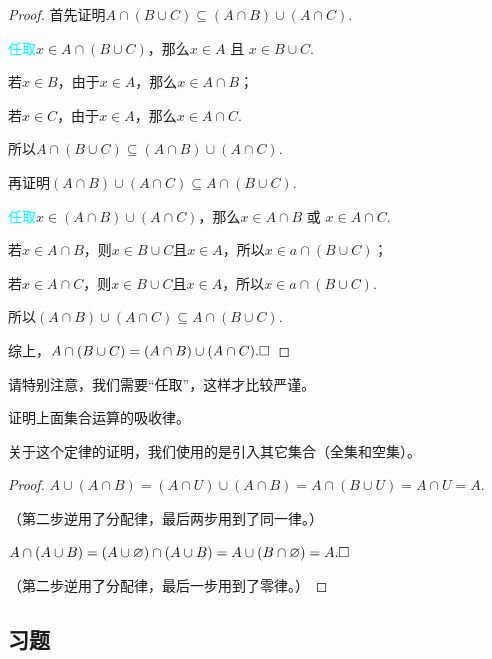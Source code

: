 \documentclass[lang=cn,math=cm,chinesefont=nofont,11pt,scheme=chinese,onecol]{elegantbook}
\begin{document}
\begin{proof}
  首先证明$A\cap(B\cup C)\subseteq(A\cap B)\cup(A\cap C)$.

  \textcolor{cyan}{任取}\enspace$x\in A\cap(B\cup C)$，那么$x\in A\text{ 且 }x\in B\cup C$.

  若$x\in B$，由于$x\in A$，那么$x\in A\cap B$；

  若$x\in C$，由于$x\in A$，那么$x\in A\cap C$.

  所以$A\cap(B\cup C)\subseteq(A\cap B)\cup(A\cap C)$.

  \hspace*{\fill}

  再证明$(A\cap B)\cup(A\cap C)\subseteq A\cap(B\cup C)$.

  \textcolor{cyan}{任取}\enspace$x\in (A\cap B)\cup(A\cap C)$，那么$x\in A\cap B\text{ 或 }x\in A\cap C$.

  若$x\in A\cap B$，则$x\in B\cup C\text{且}x\in A$，所以$x\in a\cap(B\cup C)$；

  若$x\in A\cap C$，则$x\in B\cup C\text{且}x\in A$，所以$x\in a\cap(B\cup C)$.

  所以$(A\cap B)\cup(A\cap C)\subseteq A\cap(B\cup C)$.

  综上，$A\cap(B\cup C)=(A\cap B)\cup(A\cap C).\hfill\square$
\end{proof}
\begin{remark}
  请特别注意，我们需要“任取”，这样才比较严谨。
\end{remark}

\hspace*{\fill}

\begin{example}
  证明上面集合运算的吸收律。
\end{example}
关于这个定律的证明，我们使用的是引入其它集合（全集和空集）。

\begin{proof}
  $A\cup (A\cap B)=(A\cap U)\cup(A\cap B)=A\cap(B\cup U)=A\cap U=A.$

  （第二步逆用了分配律，最后两步用到了同一律。）

  $A\cap(A\cup B)=(A\cup\varnothing)\cap(A\cup B)=A\cup(B\cap\varnothing)=A.\hfill\square$

  （第二步逆用了分配律，最后一步用到了零律。）
\end{proof}

\subsection{习题}
\end{document}
